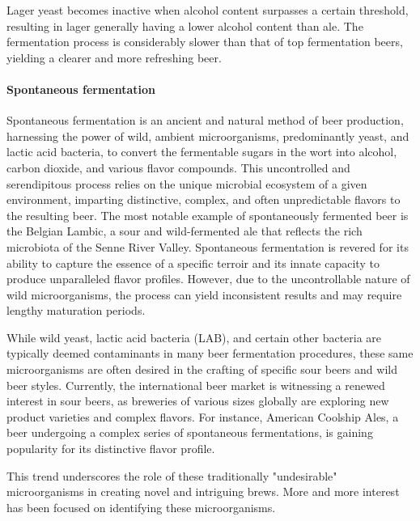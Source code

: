                 Lager yeast becomes inactive when alcohol content surpasses a certain threshold, resulting in lager generally having a lower alcohol content than ale. The fermentation process is considerably slower than that of top fermentation beers, yielding a clearer and more refreshing beer.
                
            \paragraph*{Spontaneous fermentation}
                Spontaneous fermentation is an ancient and natural method of beer production, harnessing the power of wild, ambient microorganisms, predominantly yeast, and lactic acid bacteria, to convert the fermentable sugars in the wort into alcohol, carbon dioxide, and various flavor compounds. This uncontrolled and serendipitous process relies on the unique microbial ecosystem of a given environment, imparting distinctive, complex, and often unpredictable flavors to the resulting beer. The most notable example of spontaneously fermented beer is the Belgian Lambic, a sour and wild-fermented ale that reflects the rich microbiota of the Senne River Valley\cite{spitaels2014microbial}. Spontaneous fermentation is revered for its ability to capture the essence of a specific terroir and its innate capacity to produce unparalleled flavor profiles. However, due to the uncontrollable nature of wild microorganisms, the process can yield inconsistent results and may require lengthy maturation periods.

                While wild yeast, lactic acid bacteria (LAB), and certain other bacteria are typically deemed contaminants in many beer fermentation procedures, these same microorganisms are often desired in the crafting of specific sour beers and wild beer styles. Currently, the international beer market is witnessing a renewed interest in sour beers, as breweries of various sizes globally are exploring new product varieties and complex flavors\cite{bossaert2021description}. For instance, American Coolship Ales, a beer undergoing a complex series of spontaneous fermentations, is gaining popularity for its distinctive flavor profile\cite{bokulich2012brewhouse}. 
                
                This trend underscores the role of these traditionally "undesirable" microorganisms in creating novel and intriguing brews. More and more interest has been focused on identifying these microorganisms.
                
